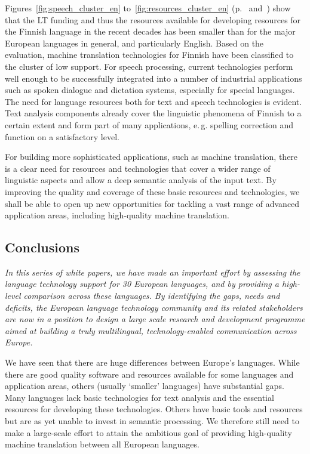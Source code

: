 \begin{multicols}{2}
Figures~\ref{fig:speech_cluster_en} to~\ref{fig:resources_cluster_en} (p.~\pageref{fig:speech_cluster_en} and~\pageref{fig:resources_cluster_en}) show that the LT funding and thus the resources available for developing resources for the Finnish language in the recent decades has been smaller than for the major European languages in general, and particularly English. Based on the evaluation, machine translation technologies for Finnish have been classified to the cluster of low support. For speech processing, current technologies perform well enough to be successfully integrated into a number of industrial applications such as spoken dialogue and dictation systems, especially for special languages. The need for language resources both for text and speech technologies is evident. Text analysis components already cover the linguistic phenomena of Finnish to a certain extent and form part of many applications, e.\,g. spelling correction and function on a satisfactory level.

For building more sophisticated applications, such as machine translation, there is a clear need for resources and technologies that cover a wider range of linguistic aspects and allow a deep semantic analysis of the input text. By improving the quality and coverage of these basic resources and technologies, we shall be able to open up new opportunities for tackling a vast range of advanced application areas, including high-quality machine translation.

\subsection{Conclusions}

\emph{In this series of white papers, we have made an important effort by assessing the language technology support for 30 European languages, and by providing a high-level comparison across these languages. By identifying the gaps, needs and deficits, the European language technology community and its related stakeholders are now in a position to design a large scale research and development programme aimed at building a truly multilingual, technology-enabled communication across Europe.}

We have seen that there are huge differences between Europe’s languages. While there are good quality software and resources available for some languages and application areas, others (usually ‘smaller’ languages) have substantial gaps.  Many languages lack basic technologies for text analysis and the essential resources for developing these technologies. Others have basic tools and resources but are as yet unable to invest in semantic processing. We therefore still need to make a large-scale effort to attain the ambitious goal of providing high-quality machine translation between all European languages.


\end{multicols}
